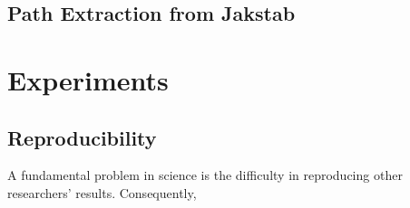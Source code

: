 \documentclass{kththesis}
\begin{document}








\subsection{Path Extraction from Jakstab}



\section{Experiments}
\subsection{Reproducibility}
A fundamental problem in science is the difficulty in reproducing other researchers' results. Consequently, 

\end{document}
